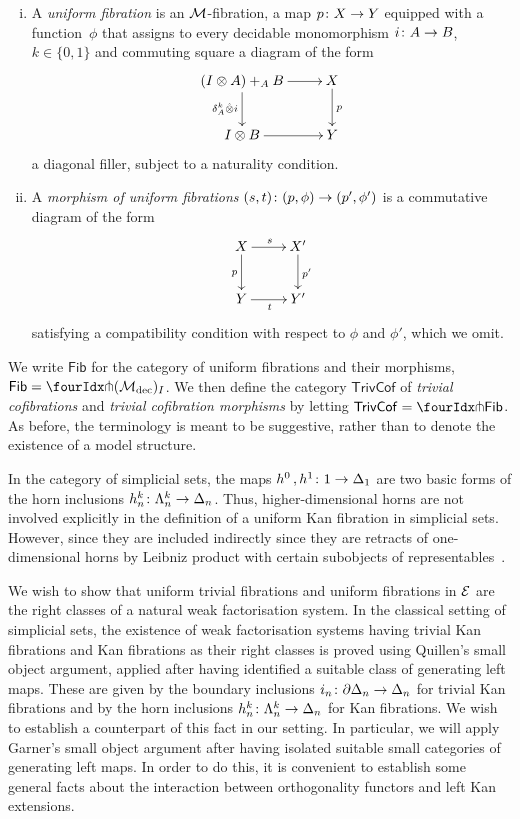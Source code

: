 \documentclass[reqno,10pt,a4paper,oneside]{amsart}
\begin{document}
\begin{definition} \hfill 
\begin{enumerate}[(i)] 
\item  A \emph{uniform  fibration} is an $\cal{M}$-fibration, \ie 
a map  $p \co X \to Y$ equipped with a function~$\phi$ that assigns
to every decidable monomorphism $i \co A \to B$, $k \in \{0, 1\}$  and commuting
square a diagram of the form
\[
\xymatrix{
 (\interval \otimes A) +_A B \ar[r] \ar[d]_{\kcyl_A \hatotimes i} & X \ar[d]^p \\
\interval \otimes  B \ar[r] & Y }
\]
a diagonal filler, subject to a naturality condition.
 \item A \emph{morphism of uniform fibrations} $(s,t) \co (p, \phi) \to (p', \phi')$ is
 a commutative diagram of the form
 \[
 \xymatrix{
  X \ar[d]_{p} \ar[r]^s & X' \ar[d]^{p'} \\
  Y \ar[r]_{t}& Y' } 
  \]
  satisfying a compatibility condition with respect to $\phi$ and $\phi'$, which we omit. 
 \end{enumerate}
 \end{definition}
 
 We write $\mathsf{Fib}$ for the category of uniform fibrations and their morphisms, \ie 
$\mathsf{Fib} = \liftr{(\cal{M}_{\textup{dec}})_I}$. We then define
the category $\mathsf{TrivCof}$ of \emph{trivial cofibrations} and \emph{trivial cofibration morphisms}
by letting \ie $\mathsf{TrivCof} = \liftl{\mathsf{Fib}}$. As before, the terminology is meant to be
suggestive, rather than to denote the existence of a model structure. 
 
 \begin{remark} In the category of simplicial sets, the maps $h^0 \, , h^1 \co 1 \to \Delta_1$ are two basic forms of the horn
 inclusions $h^k_n \co \Lambda^k_n \to \Delta_n$.  Thus, higher-dimensional horns are not involved
 explicitly in the definition of a uniform Kan fibration in simplicial sets. However, 
  since they are included indirectly since they are  retracts of one-dimensional horns by Leibniz product 
  with certain subobjects of representables~\cite{joyal-quaderns}.
  \end{remark} 
 
We wish to show that uniform trivial fibrations and uniform fibrations in $\cal{E}$ are the
right classes of a natural weak factorisation system. In the classical setting of 
simplicial sets, the existence of weak factorisation systems having trivial Kan fibrations
and Kan fibrations as their right classes is proved using Quillen's small object argument,
applied after having identified a suitable class of generating left maps. These are given
by the boundary inclusions $i_n \co \partial \Delta_n \to \Delta_n$ for trivial Kan fibrations
and by the horn inclusions $h^k_n \co \Lambda^k_n \to \Delta_n$ for Kan fibrations. 
We wish to establish a counterpart of  this fact in our setting. In particular,
we will apply Garner's small object argument after having isolated suitable
small categories of generating left maps. In order to do this, it is convenient
to establish some general facts about the interaction between orthogonality 
functors and left Kan extensions. 
\end{document}
